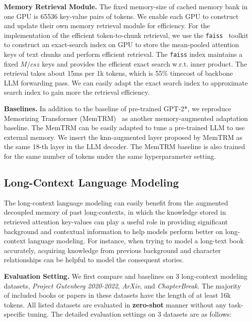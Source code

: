 \textbf{Memory Retrieval Module.} The fixed memory-size of cached memory bank in one GPU is 65536 key-value pairs of tokens. We enable each GPU to construct and update their own memory retrieval module for efficiency. For the implementation of the efficient token-to-chunk retrieval, we use the \texttt{faiss}~\citep{Johnson2021BillionScaleSS} toolkit to construct an exact-search index on GPU to store the mean-pooled attention keys of text chunks and perform efficient retrieval. The \texttt{faiss} index maintains a fixed $M/csz$ keys and provides the efficient exact search w.r.t. inner product. The retrieval takes about 15ms per 1k tokens, which is 55\% timecost of backbone LLM forwarding pass. We can easily adapt the exact search index to approximate search index to gain more the retrieval efficiency. 

\textbf{Baselines.} In addition to the baseline of pre-trained GPT-2*, we reproduce Memorizing Transformer (MemTRM)~\citep{Wu2022MemorizingT} as another memory-augmented adaptation baseline. The MemTRM can be easily adapted to tune a pre-trained LLM to use external memory. We insert the knn-augmented layer proposed by MemTRM as the same 18-th layer in the LLM decoder. The MemTRM baseline is also trained for the same number of tokens under the same hyperparameter setting.

\subsection{Long-Context Language Modeling}
\label{ssec:pastinputs}
 The long-context language modeling can easily benefit from the augmented decoupled memory of past long-contexts, in which the knowledge stored in retrieved attention key-values can play a useful role in providing significant background and contextual information to help models perform better on long-context language modeling. For instance, when trying to model a long-text book accurately, acquiring knowledge from previous background and character relationships can be helpful to model the consequent stories. 

\textbf{Evaluation Setting.} We first compare \our{} and baselines on 3 long-context modeling datasets, \textit{Project Gutenberg 2020-2022}, \textit{ArXiv}, and \textit{ChapterBreak}. The majority of included books or papers in these datasets have the length of at least 16k tokens. All listed datasets are evaluated in \textbf{zero-shot} manner without any task-specific tuning. The detailed evaluation settings on 3 datasets are as follows:

